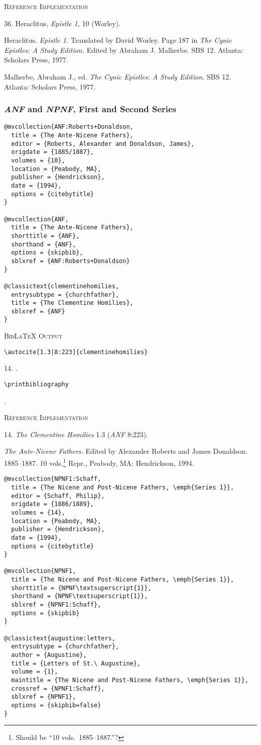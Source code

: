 \documentclass[a4paper]{article}
\newcommand\citetestnsbib[4]{%
  {\textsc{BibLaTeX Output}\par
   \nobreak
   \texttt{\textbackslash autocite[#2]\{#3\}}\par
   \color{biblatex-colour}
   #1. \cite[#2]{#3}.\par
   \color{black}
   \texttt{\textbackslash printbibliography}\par
   \color{biblatex-colour}
   \hangindent\bibindent\bibentrycite{#4}.\par}}
\newenvironment{refimp}{%
  \begin{minipage}{\linewidth}
    \setlength{\parskip}{1ex}
    \textsc{Reference Implementation}\par
    \nobreak
    \color{reference-colour}
}{\end{minipage}}
\begin{document}
\begin{refimp}
  36. Heraclitus, \emph{Epistle 1,} 10 (Worley).

  \hangindent\bibindent Heraclitus. \emph{Epistle 1.} Translated by David
  Worley. Page 187 in \emph{The Cynic Epistles: A Study Edition.} Edited by
  Abraham J. Malherbe. SBS 12. Atlanta: Scholars Press, 1977.

  \hangindent\bibindent Malherbe, Abraham J., ed. \emph{The Cynic Epistles: A
  Study Edition.} SBS 12. Atlanta: Scholars Press, 1977.
\end{refimp}

\subsubsection{\emph{ANF} and \emph{NPNF}, First and Second Series}

\begin{lstlisting}
@mvcollection{ANF:Roberts+Donaldson,
  title = {The Ante-Nicene Fathers},
  editor = {Roberts, Alexander and Donaldson, James},
  origdate = {1885/1887},
  volumes = {10},
  location = {Peabody, MA},
  publisher = {Hendrickson},
  date = {1994},
  options = {citebytitle}
}

@mvcollection{ANF,
  title = {The Ante-Nicene Fathers},
  shorttitle = {ANF},
  shorthand = {ANF},
  options = {skipbib},
  sblxref = {ANF:Roberts+Donaldson}
} 

@classictext{clementinehomilies,
  entrysubtype = {churchfather},
  title = {The Clementine Homilies},
  sblxref = {ANF}
}
\end{lstlisting}

\citetestnsbib{14}{1.3|8:223}{clementinehomilies}{ANF:Roberts+Donaldson}

\begin{refimp}
  14. \emph{The Clementine Homilies} 1.3 (\emph{ANF} 8:223).

  \hangindent\bibindent \emph{The Ante-Nicene Fathers.} Edited by Alexander
  Roberts and James Donaldson. 1885–1887. 10 vols.\footnote{Should be “10
  vols.\ 1885–1887.”?} Repr., Peabody, MA:
  Hendrickson, 1994.
\end{refimp}

\begin{lstlisting}
@mvcollection{NPNF1:Schaff,
  title = {The Nicene and Post-Nicene Fathers, \emph{Series 1}},
  editor = {Schaff, Philip},
  origdate = {1886/1889},
  volumes = {14},
  location = {Peabody, MA},
  publisher = {Hendrickson},
  date = {1994},
  options = {citebytitle}
}

@mvcollection{NPNF1,
  title = {The Nicene and Post-Nicene Fathers, \emph{Series 1}},
  shorttitle = {NPNF\textsuperscript{1}},
  shorthand = {NPNF\textsuperscript{1}},
  sblxref = {NPNF1:Schaff},
  options = {skipbib}
}

@classictext{augustine:letters,
  entrysubtype = {churchfather},
  author = {Augustine},
  title = {Letters of St.\ Augustine},
  volume = {1},
  maintitle = {The Nicene and Post-Nicene Fathers, \emph{Series 1}},
  crossref = {NPNF1:Schaff},
  sblxref = {NPNF1},
  options = {skipbib=false}
}
\end{lstlisting}
\end{document}
